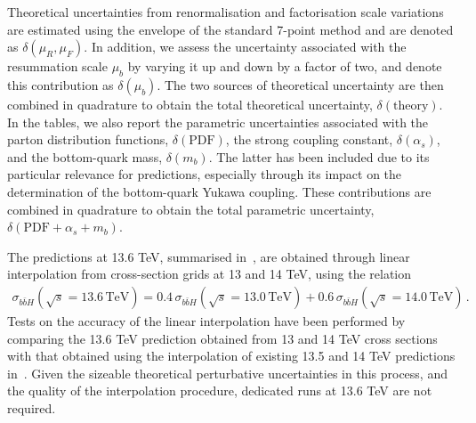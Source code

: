 Theoretical uncertainties from renormalisation and factorisation scale variations are estimated using the envelope of the standard 7-point method and are denoted as $\delta(\mu_R,\mu_F)$.
In addition, we assess the uncertainty associated with the resummation scale $\mu_b$ by varying it up and down by a factor of two, and denote this contribution as $\delta(\mu_b)$.
The two sources of theoretical uncertainty are then combined in quadrature to obtain the total theoretical uncertainty, $\delta(\text{theory})$. In the tables, we also report the parametric uncertainties associated with the parton distribution functions, $\delta(\text{PDF})$, the strong coupling constant, $\delta(\alpha_s)$, and the bottom-quark mass, $\delta(m_b)$. The latter has been included due to its particular relevance for \bbH{} predictions, especially through its impact on the determination of the bottom-quark Yukawa coupling. These contributions are combined in quadrature to obtain the total parametric uncertainty, $\delta(\text{PDF}+\alpha_s+m_b)$.

The predictions at 13.6 TeV, summarised in~, are obtained through linear interpolation from cross-section grids at 13 and 14 TeV, using the relation
\begin{align}
	\sigma_{b\bar{b}H}(\sqrt{s}=13.6\,\text{TeV})=0.4\,\sigma_{b\bar{b}H}(\sqrt{s}=13.0\,\text{TeV})+0.6\,\sigma_{b\bar{b}H}(\sqrt{s}=14.0\,\text{TeV})\,.
\end{align}
Tests on the accuracy of the linear interpolation have been performed by comparing the 13.6 TeV prediction obtained from 13 and 14 TeV cross sections with that obtained using the interpolation of existing 13.5 and 14 TeV predictions in~. Given the sizeable theoretical perturbative uncertainties in this process, and the quality of the interpolation procedure, dedicated runs at 13.6 TeV are not required. 
